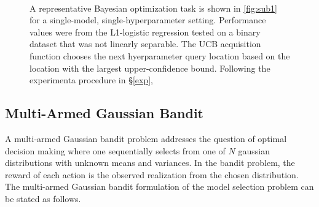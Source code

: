 \documentclass{article}
\begin{document}
\begin{figure}[h]
  \centering
  ~
  ~

  \caption{A representative Bayesian optimization task is shown in \ref{fig:sub1} for a single-model, single-hyperparameter setting. Performance values were from the L1-logistic regression tested on a binary dataset that was not linearly separable. The UCB acquisition function chooses the next hyerparameter query location based on the location with the largest upper-confidence bound. Following the experimenta procedure in \S\ref{exp}, }
\end{figure}

\subsection{Multi-Armed Gaussian Bandit}
A multi-armed Gaussian bandit problem addresses the question of optimal decision making where one sequentially selects from one of $N$ gaussian distributions with unknown means and variances. In the bandit problem, the reward of each action is the observed realization from the chosen distribution. The multi-armed Gaussian bandit formulation of the model selection problem can be stated as follows.
\end{document}
